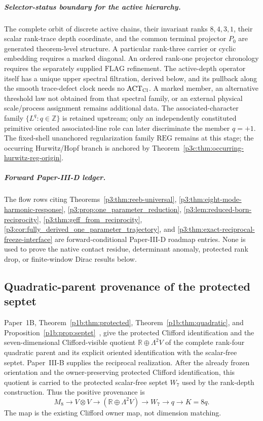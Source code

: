 \documentclass[12pt,a4paper]{article}
\begin{document}
\subparagraph{Selector-status boundary for the active hierarchy.}
The complete orbit of discrete active chains, their invariant ranks
\(8,4,3,1\), their scalar rank-trace depth coordinate, and the common terminal
projector \(P_0\) are generated theorem-level structure.  A particular
rank-three carrier or cyclic embedding requires a marked diagonal.  An
ordered rank-one projector chronology requires the separately supplied
\(\mathrm{FLAG}\) refinement.  The active-depth operator itself has a unique
upper spectral filtration, derived below, and its pullback along the smooth
trace-defect clock needs no \(\mathrm{ACT}_{\rm Cl}\).  A marked member, an
alternative threshold law not obtained from that spectral family, or an
external physical scale/process assignment remains additional data.
The associated-character family \(\{L^q:q\in\mathbb Z\}\) is retained
upstream; only an independently constituted primitive oriented associated-line
role can later discriminate the member \(q=+1\).  The fixed-shell
unanchored regularization family \(\mathrm{REG}\) remains at this stage; the occurring Hurwitz/Hopf branch is anchored by Theorem~\ref{p3c:thm:occurring-hurwitz-reg-origin}.

\subparagraph{Forward Paper-III-D ledger.}
The flow rows citing
Theorems~\ref{p3:thm:reeb-universal},
\ref{p3:thm:eight-mode-harmonic-response},
\ref{p3:prop:one_parameter_reduction},
\ref{p3:lem:reduced-born-reciprocity},
\ref{p3:thm:geff_from_reciprocity},
\ref{p3:cor:fully_derived_one_parameter_trajectory}, and
\ref{p3:thm:exact-reciprocal-freeze-interface}
are forward-conditional Paper-III-D roadmap entries.  None is used to prove
the native contact residue, determinant anomaly, protected rank drop, or
finite-window Dirac results below.

\label{p3:part:hierarchy-reduction}

\subsection{Quadratic-parent provenance of the protected septet}
\label{p3c:sec:v189-quadratic-parent-septet}
Paper~1B, Theorem~\ref{p1b:thm:protected},
Theorem~\ref{p1b:thm:quadratic}, and
Proposition~\ref{p1b:prop:septet}~\cite{Kugelmann2026Paper1B}, give the
protected Clifford identification and the seven-dimensional Clifford-visible quotient
$\mathbb R\oplus\Lambda^2V$ of the complete rank-four quadratic parent
and its explicit oriented identification with the scalar-free septet.
Paper~III-B supplies the reciprocal realization.  After
the already frozen orientation and the owner-preserving protected Clifford
identification, this quotient is carried to the protected scalar-free septet
$W_7$ used by the rank-depth construction.  Thus the positive provenance is
\[
 \boxed{M_8\to V\otimes V\to
 (\mathbb R\oplus\Lambda^2V)\to W_7\to q\to K=8q.}
\]
The map is the existing Clifford owner map, not dimension matching.
\end{document}
